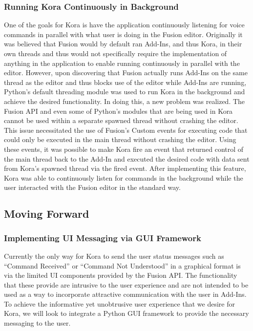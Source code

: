 \documentclass[onecolumn, draftclsnofoot,10pt, compsoc]{IEEEtran}
\begin{document}
	    \subsubsection{Running Kora Continuously in Background}
	   		One of the goals for Kora is have the application continuously listening for voice commands in parallel with what user is doing in the Fusion editor.
		    Originally it was believed that Fusion would by default ran Add-Ins, and thus Kora, in their own threads and thus would not specifically require the implementation of anything in the application to enable running continuously in parallel with the editor.
		    However, upon discovering that Fusion actually runs Add-Ins on the same thread as the editor and thus blocks use of the editor while Add-Ins are running, Python’s default threading module was used to run Kora in the background and achieve the desired functionality.
		    In doing this, a new problem was realized.
		    The Fusion API and even some of Python’s modules that are being used in Kora cannot be used within a separate spawned thread without crashing the editor.
		    This issue necessitated the use of Fusion’s Custom events for executing code that could only be executed in the main thread without crashing the editor.
		    Using these events, it was possible to make Kora fire an event that returned control of the main thread back to the Add-In and executed the desired code with data sent from Kora’s spawned thread via the fired event.
	    	After implementing this feature, Kora was able to continuously listen for commands in the background while the user interacted with the Fusion editor in the standard way.

		
	\subsection{Moving Forward}
    	\subsubsection{Implementing UI Messaging via GUI Framework}	
		    Currently the only way for Kora to send the user status messages such as “Command Received” or “Command Not Understood” in a graphical format is via the limited UI components provided by the Fusion API.
		    The functionality that these provide are intrusive to the user experience and are not intended to be used as a way to incorporate attractive communication with the user in Add-Ins.
		    To achieve the informative yet unobtrusive user experience that we desire for Kora, we will look to integrate a Python GUI framework to provide the necessary messaging to the user.
\end{document}
